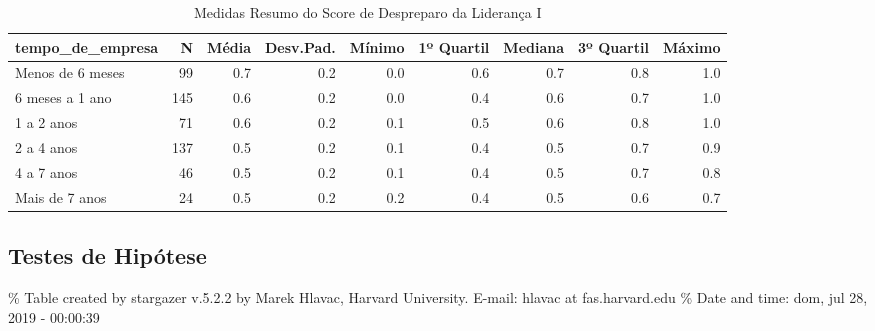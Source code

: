 \documentclass[]{book}
\begin{document}
\begin{table}[t]

\caption{\label{tab:unnamed-chunk-16}Medidas Resumo do Score de Despreparo da Liderança I}
\centering
\fontsize{7}{9}\selectfont
\begin{tabular}{lrrrrrrrr}
\toprule
tempo\_de\_empresa & N & Média & Desv.Pad. & Mínimo & 1º Quartil & Mediana & 3º Quartil & Máximo\\
\midrule
Menos de 6 meses & 99 & 0.7 & 0.2 & 0.0 & 0.6 & 0.7 & 0.8 & 1.0\\
6 meses a 1 ano & 145 & 0.6 & 0.2 & 0.0 & 0.4 & 0.6 & 0.7 & 1.0\\
1 a 2 anos & 71 & 0.6 & 0.2 & 0.1 & 0.5 & 0.6 & 0.8 & 1.0\\
2 a 4 anos & 137 & 0.5 & 0.2 & 0.1 & 0.4 & 0.5 & 0.7 & 0.9\\
4 a 7 anos & 46 & 0.5 & 0.2 & 0.1 & 0.4 & 0.5 & 0.7 & 0.8\\
\addlinespace
Mais de 7 anos & 24 & 0.5 & 0.2 & 0.2 & 0.4 & 0.5 & 0.6 & 0.7\\
\bottomrule
\end{tabular}
\end{table}

\pagebreak

\hypertarget{testes-de-hipotese-2}{%
\subsection{Testes de Hipótese}\label{testes-de-hipotese-2}}

\% Table created by stargazer v.5.2.2 by Marek Hlavac, Harvard University. E-mail: hlavac at fas.harvard.edu
\% Date and time: dom, jul 28, 2019 - 00:00:39
\end{document}
